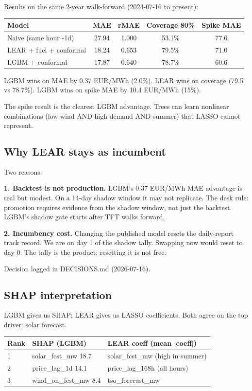 Results on the same 2-year walk-forward (2024-07-16 to present):

\begin{center}
\begin{tabular}{lcccc}
\toprule
Model & MAE & rMAE & Coverage 80\% & Spike MAE \\
\midrule
Naive (same hour -1d) & 27.94 & 1.000 & 53.1\% & 77.6 \\
LEAR + fuel + conformal & 18.24 & 0.653 & 79.5\% & 71.0 \\
LGBM + conformal & 17.87 & 0.640 & 78.7\% & 60.6 \\
\bottomrule
\end{tabular}
\end{center}

LGBM wins on MAE by 0.37 EUR/MWh (2.0\%).
LEAR wins on coverage (79.5 vs 78.7\%).
LGBM wins on spike MAE by 10.4 EUR/MWh (15\%).

The spike result is the clearest LGBM advantage. Trees can learn
nonlinear combinations (low wind AND high demand AND summer)
that LASSO cannot represent.

\subsection{Why LEAR stays as incumbent}

Two reasons:

\textbf{1. Backtest is not production.}
LGBM's 0.37 EUR/MWh MAE advantage is real but modest.
On a 14-day shadow window it may not replicate.
The desk rule: promotion requires evidence from the shadow window,
not just the backtest. LGBM's shadow gate starts after TFT walks forward.

\textbf{2. Incumbency cost.}
Changing the published model resets the daily-report track record.
We are on day 1 of the shadow tally. Swapping now would reset to day 0.
The tally is the product; resetting it is not free.

Decision logged in DECISIONS.md (2026-07-16).

\subsection{SHAP interpretation}

LGBM gives us SHAP; LEAR gives us LASSO coefficients.
Both agree on the top driver: solar forecast.

\begin{center}
\begin{tabular}{lll}
\toprule
Rank & SHAP (LGBM) & LEAR coeff (mean $|$coeff$|$) \\
\midrule
1 & solar\_fcst\_mw 18.7 & solar\_fcst\_mw (high in summer) \\
2 & price\_lag\_1d 14.1 & price\_lag\_168h (all hours) \\
3 & wind\_on\_fcst\_mw 8.4 & tso\_forecast\_mw \\
\bottomrule
\end{tabular}
\end{center}

